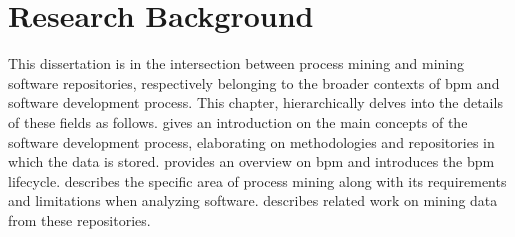 \chapter{Research Background}


This dissertation is in the intersection between process mining and mining software repositories, respectively belonging to the broader contexts of \gls{bpm} and software development process. This chapter, hierarchically delves into the details of these fields as follows.  gives an introduction on the main concepts of the software development process, elaborating on methodologies and repositories in which the data is stored.
 provides an overview on \gls{bpm} and introduces the \gls{bpm} lifecycle.  describes the specific area of process mining along with its requirements and limitations when analyzing software.  describes related work on mining data from these repositories. 


 


